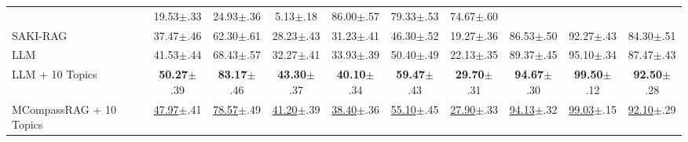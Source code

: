 \begin{table}[h]
{\begin{tabular}{lccccccccc}
      & 19.53{\scriptsize\textcolor{red!70!black}{$\pm$.33}} & 24.93{\scriptsize\textcolor{red!70!black}{$\pm$.36}} &  5.13{\scriptsize\textcolor{red!70!black}{$\pm$.18}}
      & 86.00{\scriptsize\textcolor{red!70!black}{$\pm$.57}} & 79.33{\scriptsize\textcolor{red!70!black}{$\pm$.53}} & 74.67{\scriptsize\textcolor{red!70!black}{$\pm$.60}} \\
    SAKI-RAG
      & 37.47{\scriptsize\textcolor{red!70!black}{$\pm$.46}} & 62.30{\scriptsize\textcolor{red!70!black}{$\pm$.61}} & 28.23{\scriptsize\textcolor{red!70!black}{$\pm$.43}}
      & 31.23{\scriptsize\textcolor{red!70!black}{$\pm$.41}} & 46.30{\scriptsize\textcolor{red!70!black}{$\pm$.52}} & 19.27{\scriptsize\textcolor{red!70!black}{$\pm$.36}}
      & 86.53{\scriptsize\textcolor{red!70!black}{$\pm$.50}} & 92.27{\scriptsize\textcolor{red!70!black}{$\pm$.43}} & 84.30{\scriptsize\textcolor{red!70!black}{$\pm$.51}} \\
    \hline
    LLM
      & 41.53{\scriptsize\textcolor{red!70!black}{$\pm$.44}} & 68.43{\scriptsize\textcolor{red!70!black}{$\pm$.57}} & 32.27{\scriptsize\textcolor{red!70!black}{$\pm$.41}}
      & 33.93{\scriptsize\textcolor{red!70!black}{$\pm$.39}} & 50.40{\scriptsize\textcolor{red!70!black}{$\pm$.49}} & 22.13{\scriptsize\textcolor{red!70!black}{$\pm$.35}}
      & 89.37{\scriptsize\textcolor{red!70!black}{$\pm$.45}} & 95.10{\scriptsize\textcolor{red!70!black}{$\pm$.34}} & 87.47{\scriptsize\textcolor{red!70!black}{$\pm$.43}} \\
    LLM + 10 Topics
      & \textbf{50.27}{\scriptsize\textcolor{red!70!black}{$\pm$.39}} & \textbf{83.17}{\scriptsize\textcolor{red!70!black}{$\pm$.46}} & \textbf{43.30}{\scriptsize\textcolor{red!70!black}{$\pm$.37}}
      & \textbf{40.10}{\scriptsize\textcolor{red!70!black}{$\pm$.34}} & \textbf{59.47}{\scriptsize\textcolor{red!70!black}{$\pm$.43}} & \textbf{29.70}{\scriptsize\textcolor{red!70!black}{$\pm$.31}}
      & \textbf{94.67}{\scriptsize\textcolor{red!70!black}{$\pm$.30}} & \textbf{99.50}{\scriptsize\textcolor{red!70!black}{$\pm$.12}} & \textbf{92.50}{\scriptsize\textcolor{red!70!black}{$\pm$.28}} \\
    \hline
    \rowcolor{oursblue}
    MCompassRAG + 10 Topics
      & \underline{47.97}{\scriptsize\textcolor{red!70!black}{$\pm$.41}} & \underline{78.57}{\scriptsize\textcolor{red!70!black}{$\pm$.49}} & \underline{41.20}{\scriptsize\textcolor{red!70!black}{$\pm$.39}}
      & \underline{38.40}{\scriptsize\textcolor{red!70!black}{$\pm$.36}} & \underline{55.10}{\scriptsize\textcolor{red!70!black}{$\pm$.45}} & \underline{27.90}{\scriptsize\textcolor{red!70!black}{$\pm$.33}}
      & \underline{94.13}{\scriptsize\textcolor{red!70!black}{$\pm$.32}} & \underline{99.03}{\scriptsize\textcolor{red!70!black}{$\pm$.15}} & \underline{92.10}{\scriptsize\textcolor{red!70!black}{$\pm$.29}} \\
    \bottomrule
    \end{tabular}
    }%


\end{table}
